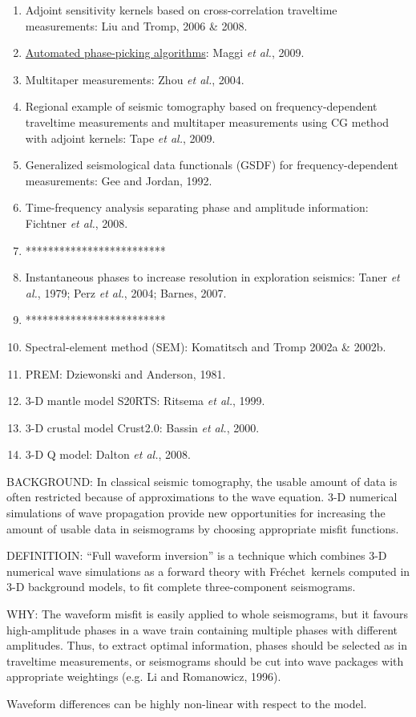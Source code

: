\documentclass{article}
\newcommand{\sline}{*************************}
\newcommand{\myem}[1]{{\color{red}\uline{#1}}}
\newcommand{\myno}[1]{{\color{blue}#1}}
\newcommand{\mynno}[1]{{\color{red}#1}}
\newcommand{\Frechet}{Fr\'{e}chet~}
\newcommand{\etal}{\textit{et al.}}
\begin{document}
\begin{enumerate}[\hspace{10mm}*]
  \item Adjoint sensitivity kernels based on cross-correlation traveltime measurements: Liu and Tromp, 2006 \& 2008.
  \item \myem{Automated phase-picking algorithms}: Maggi \etal, 2009.
  \item Multitaper measurements: Zhou \etal, 2004.
  \item Regional example of seismic tomography based on frequency-dependent traveltime measurements and multitaper measurements using CG method with adjoint kernels: Tape \etal, 2009.
  \item Generalized seismological data functionals (GSDF) for frequency-dependent measurements: Gee and Jordan, 1992.
  \item Time-frequency analysis separating phase and amplitude information: Fichtner \etal, 2008.
  \item \sline
  \item Instantaneous phases to increase resolution in exploration seismics: Taner \etal, 1979; Perz \etal, 2004; Barnes, 2007.
  \item \sline
  \item Spectral-element method (SEM): Komatitsch and Tromp 2002a \& 2002b.
  \item PREM: Dziewonski and Anderson, 1981.
  \item 3-D mantle model \mynno{S20RTS}: Ritsema \etal, 1999.
  \item 3-D crustal model Crust2.0: Bassin \etal, 2000.
  \item 3-D Q model: Dalton \etal, 2008.
\end{enumerate}\par
\myno{BACKGROUND:} In classical seismic tomography, the usable amount of data is often restricted because of approximations to the wave equation. 3-D numerical simulations of wave propagation provide new opportunities for increasing the amount of usable data in seismograms by choosing appropriate misfit functions.\par
\myno{DEFINITIOIN:} ``Full waveform inversion'' is a technique which combines 3-D numerical wave simulations as a forward theory with \Frechet kernels computed in 3-D background models, to fit complete three-component seismograms.\par
\myno{WHY:} The waveform misfit is easily applied to whole seismograms, but it favours high-amplitude phases in a wave train containing multiple phases with different amplitudes. Thus, to extract optimal information, phases should be selected as in traveltime measurements, or seismograms should be cut into wave packages with appropriate weightings (e.g. Li and Romanowicz, 1996).\par
Waveform differences can be highly non-linear with respect to the model.\par
\end{document}
